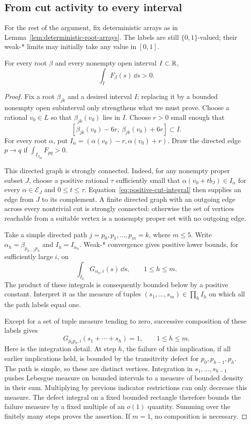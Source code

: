\subsection{From cut activity to every interval}

For the rest of the argument, fix deterministic arrays as in
Lemma~\ref{lem:deterministic-root-arrays}.  The labels are still
$\{0,1\}$-valued; their weak-* limits may initially take any value in
$[0,1]$.

\begin{lemma}\label{lem:positive-root-intervals}
For every root $\beta$ and every nonempty open interval $I\subset\mathbb R$,
\[
 \int_I F_\beta(s)\,\dd s>0.
\]
\end{lemma}

\begin{proof}
Fix a root $\beta_{jk}$ and a desired interval $I$; replacing it by a
bounded nonempty open subinterval only strengthens what we must prove.
Choose a rational
$v_0\in L$ so that $\beta_{jk}(v_0)$ lies in $I$.  Choose $r>0$ small
enough that
\[
 [\beta_{jk}(v_0)-6r,\ \beta_{jk}(v_0)+6r]\subset I.
\]
For every root $\alpha$, put
$I_\alpha=(\alpha(v_0)-r,\alpha(v_0)+r)$.  Draw the directed edge
$p\to q$ if $\int_{I_{\beta_{pq}}}F_{pq}>0$.

This directed graph is strongly connected.  Indeed, for any nonempty
proper subset $J$, choose a positive rational $\tau$ sufficiently small
that $\alpha(v_0+t b_J)\in I_\alpha$ for every
$\alpha\in\mathcal E_J$ and $0\leq t\leq\tau$.
Equation~\eqref{eq:positive-cut-integral} then supplies an edge from
$J$ to its complement.  A finite directed graph with an outgoing edge
across every nontrivial cut is strongly connected: otherwise the set of
vertices reachable from a suitable vertex is a nonempty proper set
with no outgoing edge.

Take a simple directed path
$j=p_0,p_1,\ldots,p_m=k$, where $m\leq5$.  Write
$\alpha_h=\beta_{p_{h-1}p_h}$ and $I_h=I_{\alpha_h}$.  Weak-*
convergence gives positive lower bounds, for sufficiently large $i$, on
\[
 \int_{I_h}G_{\alpha_h,i}(s)\,\dd s,
 \qquad 1\leq h\leq m.
\]
The product of these integrals is consequently bounded below by a
positive constant.  Interpret it as the measure of tuples
$(s_1,\ldots,s_m)\in\prod_h I_h$ on which all the path labels equal
one.

Except for a set of tuple measure tending to zero, successive composition
of these labels gives
\[
 G_{p_0p_h,i}(s_1+\cdots+s_h)=1,
 \qquad 1\leq h\leq m.
\]
Here is the integration detail.  At step $h$, the failure of this
implication, if all earlier implications held, is bounded by the
transitivity defect for $p_0,p_{h-1},p_h$.  The path is simple, so these
are distinct vertices.  Integration in $s_1,\ldots,s_{h-1}$ pushes
Lebesgue measure on bounded intervals to a measure of bounded density
in their sum.  Multiplying by previous indicator restrictions can only
decrease this measure.  The defect integral on a fixed bounded
rectangle therefore bounds the failure measure by a fixed multiple of
an $o(1)$ quantity.  Summing over the finitely many steps proves the
assertion.  If $m=1$, no composition is necessary.


\end{proof}
